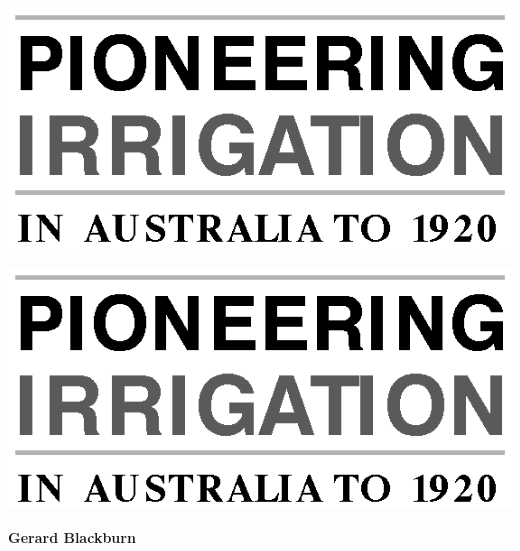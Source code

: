 \documentclass[11pt,b5paper,titlepage]{book}
\newcommand{\clearemptydoublepage}{\newpage{\pagestyle{empty}\cleardoublepage}}
\begin{document}
\frontmatter

\begin{titlepage}
\pagestyle{empty}

\begin{center}

\vspace*{60mm}


\includegraphics{Figures/fixedtitle.eps}

\end{center}
\clearemptydoublepage

\begin{center}
\vspace*{30mm}

\includegraphics{Figures/fixedtitle.eps}

\vspace{30mm}
{\bfseries\sffamily\huge Gerard Blackburn}


\end{center}
\end{titlepage}
\end{document}
